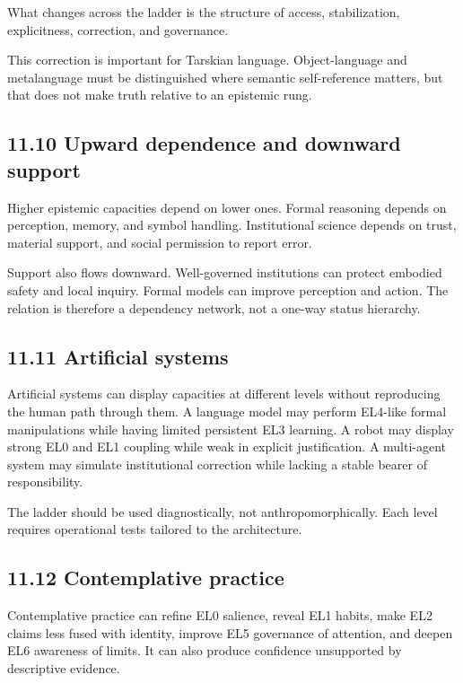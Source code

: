 \documentclass[
  11pt,
]{article}
\begin{document}
What changes across the ladder is the structure of access,
stabilization, explicitness, correction, and governance.

This correction is important for Tarskian language. Object-language and
metalanguage must be distinguished where semantic self-reference
matters, but that does not make truth relative to an epistemic rung.

\subsection{11.10 Upward dependence and downward
support}\label{upward-dependence-and-downward-support}

Higher epistemic capacities depend on lower ones. Formal reasoning
depends on perception, memory, and symbol handling. Institutional
science depends on trust, material support, and social permission to
report error.

Support also flows downward. Well-governed institutions can protect
embodied safety and local inquiry. Formal models can improve perception
and action. The relation is therefore a dependency network, not a
one-way status hierarchy.

\subsection{11.11 Artificial systems}\label{artificial-systems}

Artificial systems can display capacities at different levels without
reproducing the human path through them. A language model may perform
EL4-like formal manipulations while having limited persistent EL3
learning. A robot may display strong EL0 and EL1 coupling while weak in
explicit justification. A multi-agent system may simulate institutional
correction while lacking a stable bearer of responsibility.

The ladder should be used diagnostically, not anthropomorphically. Each
level requires operational tests tailored to the architecture.

\subsection{11.12 Contemplative practice}\label{contemplative-practice}

Contemplative practice can refine EL0 salience, reveal EL1 habits, make
EL2 claims less fused with identity, improve EL5 governance of
attention, and deepen EL6 awareness of limits. It can also produce
confidence unsupported by descriptive evidence.
\end{document}
